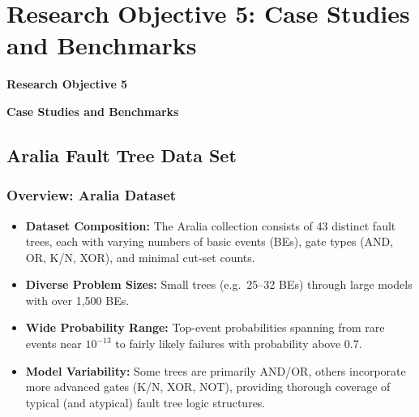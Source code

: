 
\section{Research Objective 5: Case Studies and Benchmarks}
\begin{frame}
    \Large{\centerline{\textbf{Research Objective 5}}}
    \vspace{6pt}
    \large{\centerline{\textbf{Case Studies and Benchmarks}}}
\end{frame}

\subsection{Aralia Fault Tree Data Set}
\begin{frame}[t]
\frametitle{Overview: Aralia Dataset}
\begin{itemize}
  \item \textbf{Dataset Composition:} The Aralia collection consists of 43 distinct fault trees, each with varying numbers of basic events (BEs), gate types (AND, OR, K/N, XOR), and minimal cut-set counts.  
  \item \textbf{Diverse Problem Sizes:} Small trees (e.g.\ 25--32 BEs) through large models with over 1{,}500 BEs.  
  \item \textbf{Wide Probability Range:} Top-event probabilities spanning from rare events near \(10^{-13}\) to fairly likely failures with probability above 0.7.  
  \item \textbf{Model Variability:} Some trees are primarily AND/OR, others incorporate more advanced gates (K/N, XOR, NOT), providing thorough coverage of typical (and atypical) fault tree logic structures.
\end{itemize}
\end{frame}

\begin{frame}[allowframebreaks]
    
\end{frame}

